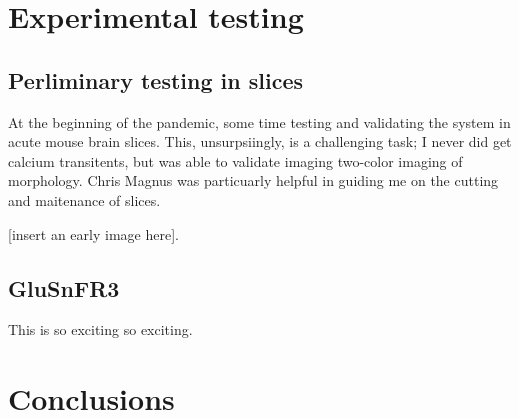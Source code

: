 \documentclass[a4paper,10pt]{article}
\begin{document}
\section{Experimental testing}

\subsection{Perliminary testing in slices}

At the beginning of the pandemic, some time testing and validating the system in acute mouse brain slices.  This, unsurpsiingly, is a challenging task; I never did get  calcium transitents, but was able to validate imaging two-color imaging of morphology. Chris Magnus was particuarly helpful in guiding me on the cutting and maitenance of slices.  

[insert an early image here].  

\subsection{GluSnFR3}

This is so exciting so exciting. 

\section{Conclusions}
\end{document}
